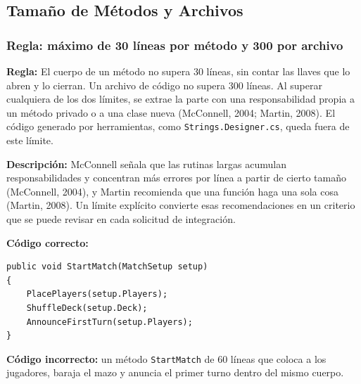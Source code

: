 \subsection{Tamaño de Métodos y Archivos}

\subsubsection{Regla: máximo de 30 líneas por método y 300 por archivo}

\textbf{Regla:} El cuerpo de un método no supera 30 líneas, sin contar las llaves que lo abren y lo cierran. Un archivo de código no supera 300 líneas. Al superar cualquiera de los dos límites, se extrae la parte con una responsabilidad propia a un método privado o a una clase nueva (McConnell, 2004; Martin, 2008). El código generado por herramientas, como \texttt{Strings.Designer.cs}, queda fuera de este límite.

\textbf{Descripción:} McConnell señala que las rutinas largas acumulan responsabilidades y concentran más errores por línea a partir de cierto tamaño (McConnell, 2004), y Martin recomienda que una función haga una sola cosa (Martin, 2008). Un límite explícito convierte esas recomendaciones en un criterio que se puede revisar en cada solicitud de integración.

\textbf{Código correcto:}
\begin{lstlisting}[style=csharpstyle]
public void StartMatch(MatchSetup setup)
{
    PlacePlayers(setup.Players);
    ShuffleDeck(setup.Deck);
    AnnounceFirstTurn(setup.Players);
}
\end{lstlisting}

\textbf{Código incorrecto:} un método \texttt{StartMatch} de 60 líneas que coloca a los jugadores, baraja el mazo y anuncia el primer turno dentro del mismo cuerpo.
